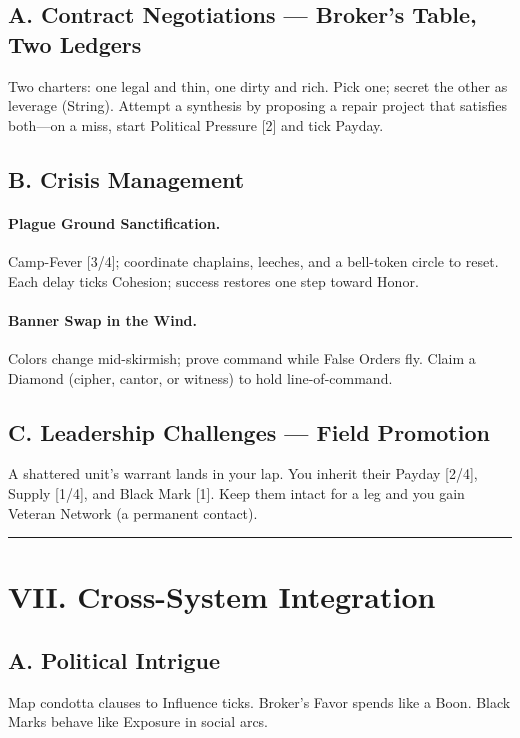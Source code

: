 \documentclass[11pt]{article}
\begin{document}
\subsection*{A. Contract Negotiations --- Broker's Table, Two Ledgers}

Two charters: one legal and thin, one dirty and rich. Pick one; secret the other as leverage (String). Attempt a synthesis by proposing a repair project that satisfies both---on a miss, start Political Pressure [2] and tick Payday.

\subsection*{B. Crisis Management}

\paragraph{Plague Ground Sanctification.} Camp-Fever [3/4]; coordinate chaplains, leeches, and a bell-token circle to reset. Each delay ticks Cohesion; success restores one step toward Honor.

\paragraph{Banner Swap in the Wind.} Colors change mid-skirmish; prove command while False Orders fly. Claim a Diamond (cipher, cantor, or witness) to hold line-of-command.

\subsection*{C. Leadership Challenges --- Field Promotion}

A shattered unit's warrant lands in your lap. You inherit their Payday [2/4], Supply [1/4], and Black Mark [1]. Keep them intact for a leg and you gain Veteran Network (a permanent contact).

\rule{\textwidth}{0.4pt}

\section*{VII. Cross-System Integration}

\subsection*{A. Political Intrigue}

Map condotta clauses to Influence ticks. Broker's Favor spends like a Boon. Black Marks behave like Exposure in social arcs.
\end{document}
